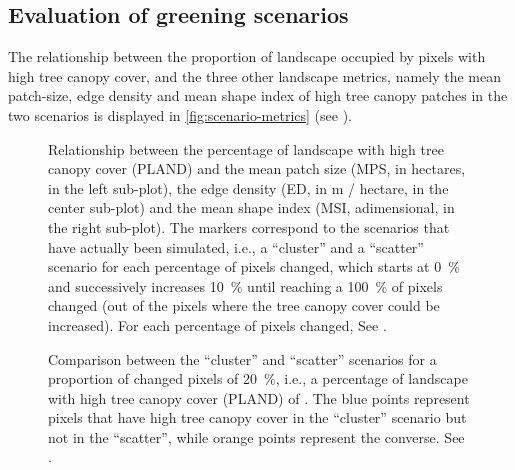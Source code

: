 \documentclass[10pt,letterpaper]{article}
\begin{document}
\subsection*{Evaluation of greening scenarios}

The relationship between the proportion of landscape occupied by pixels with high tree canopy cover, and the three other landscape metrics, namely the mean patch-size, edge density and mean shape index of high tree canopy patches in the two scenarios is displayed in \autoref{fig:scenario-metrics} (see ).

\begin{figure}[ht]
  \begin{adjustwidth}{-.4\textwidth}{0cm}
    \centering
    \caption{\label{fig:scenario-metrics} Relationship between the percentage of landscape with high tree canopy cover (PLAND) and the mean patch size (MPS, in hectares, in the left sub-plot), the edge density (ED, in m / hectare, in the center sub-plot) and the mean shape index (MSI, adimensional, in the right sub-plot). The markers correspond to the scenarios that have actually been simulated, i.e., a ``cluster'' and a ``scatter'' scenario for each percentage of pixels changed, which starts at 0~\% and successively increases 10~\% until reaching a 100~\% of pixels changed (out of the pixels where the tree canopy cover could be increased). For each percentage of pixels changed, See .}
  \end{adjustwidth}
\end{figure}



\begin{figure}[ht]
  \begin{adjustwidth}{-.4\textwidth}{0cm}
    \centering
    \caption{\label{fig:scenario-maps} Comparison between the ``cluster'' and ``scatter'' scenarios for a proportion of changed pixels of 20~\%, i.e., a percentage of landscape with high tree canopy cover (PLAND) of . The blue points represent pixels that have high tree canopy cover in the ``cluster'' scenario but not in the ``scatter'', while orange points represent the converse. See .}
  \end{adjustwidth}
\end{figure}
  
\end{document}
